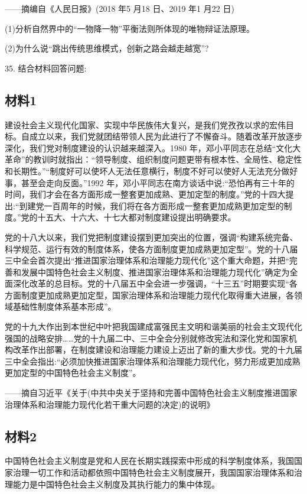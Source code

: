 \documentclass[UTF8,11pt]{ctexart}
\begin{document}
——摘编自《人民日报》(2018 年5 月18 日、2019 年1 月22 日)

(1)分析自然界中的“一物降一物”平衡法则所体现的唯物辩证法原理。


(2)为什么说“跳出传统思维模式，创新之路会越走越宽”?


35. 结合材料回答问题:


\subsection*{材料1}

建设社会主义现代化国家、实现中华民族伟大复兴，是我们党孜孜以求的宏伟目标。自成立以来，我们党就团结带领人民为此进行了不懈奋斗。随着改革开放逐步深化，我们党对制度建设的认识越来越深入。1980 年，邓小平同志在总结“文化大革命”的教训时就指出：“领导制度、组织制度问题更带有根本性、全局性、稳定性和长期性。”“制度好可以使坏人无法任意横行，制度不好可以使好人无法充分做好事，甚至会走向反面。”1992 年，邓小平同志在南方谈话中说:“恐怕再有三十年的时间，我们才会在各方面形成一整套更加成熟、更加定型的制度。”党的十四大提出:“到建党一百周年的时候，我们将在各方面形成一整套更加成熟更加定型的制度。”党的十五大、十六大、十七大都对制度建设提出明确要求。

党的十八大以来，我们党把制度建设摆到更加突出的位置，强调“构建系统完备、科学规范、运行有效的制度体系，使各方面制度更加成熟更加定型”。党的十八届三中全会首次提出“推进国家治理体系和治理能力现代化”这个重大命题，并把“完善和发展中国特色社会主义制度、推进国家治理体系和治理能力现代化”确定为全面深化改革的总目标。党的十八届五中全会进一步强调，“十三五”时期要实现“各方面制度更加成熟更加定型，国家治理体系和治理能力现代化取得重大进展，各领域基础性制度体系基本形成”。

党的十九大作出到本世纪中叶把我国建成富强民主文明和谐美丽的社会主文现代化强国的战略安排……党的十九届二中、三中全会分别就修改宪法和深化党和国家机构改革作出部署，在制度建设和治理能力建设上迈出了新的重大步伐。党的十九届三中全会指出:“必须加快推进国家治理体系和治理能力现代化，努力形成更加成熟更加定型的中国特色社会主义制度”。

——摘自习近平《关于(中共中央关于坚持和完善中国特色社会主义制度推进国家治理体系和治理能力现代化若干重大问题的决定)的说明》

\subsection*{材料2}

中国特色社会主义制度是党和人民在长期实践探索中形成的科学制度体系，我国国家治理一切工作和活动都依照中国特色社会主义制度展开，我国国家治理体系和治理能力是中国特色社会主义制度及其执行能力的集中体现。
\end{document}
